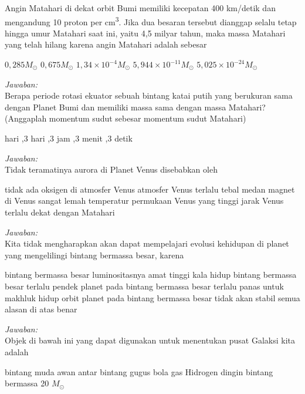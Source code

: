\documentclass[11pt,fleqn]{exam}
\begin{document}
\begin{questions}
\question Angin Matahari di dekat orbit Bumi memiliki kecepatan 400 km/detik dan mengandung 10 proton per cm\textsuperscript{3}. Jika dua besaran tersebut dianggap selalu tetap hingga umur Matahari saat ini,  yaitu 4,5 milyar tahun, maka massa Matahari yang telah hilang karena angin Matahari adalah sebesar
\begin{choices}
\choice $0,285 M_{\odot}$
\choice $0,675 M_{\odot}$
\choice $1,34\times 10^{-4} M_{\odot}$
\choice $5,944\times 10^{-11} M_{\odot}$
\choice $5,025\times 10^{-24} M_{\odot}$
\end{choices}

\textit{Jawaban: }\\


\question Berapa periode rotasi ekuator sebuah bintang katai putih yang berukuran sama dengan Planet Bumi dan memiliki massa sama dengan massa Matahari? (Anggaplah momentum sudut sebesar momentum sudut Matahari)
\begin{choices}
 hari
,3 hari
,3 jam
,3 menit
,3 detik
\end{choices}

\textit{Jawaban: } \\

\question Tidak teramatinya aurora di Planet Venus disebabkan oleh
\begin{choices}
\choice tidak ada oksigen di atmosfer Venus
\choice atmosfer Venus terlalu tebal
\choice medan magnet di Venus sangat lemah
\choice temperatur permukaan Venus yang tinggi
\choice jarak Venus terlalu dekat dengan Matahari
\end{choices}

\textit{Jawaban: } \\

\question Kita tidak mengharapkan akan dapat mempelajari evolusi kehidupan di planet yang mengelilingi bintang bermassa besar, karena
\begin{choices}
\choice bintang bermassa besar luminositasnya amat tinggi
\choice kala hidup bintang bermassa besar terlalu pendek
\choice planet pada bintang bermassa besar terlalu panas untuk makhluk hidup
\choice orbit planet pada bintang bermassa besar tidak akan stabil
\choice semua alasan di atas benar
\end{choices}

\textit{Jawaban: } \\


\question Objek di bawah ini yang dapat digunakan untuk menentukan pusat Galaksi kita adalah
\begin{choices}
\choice bintang muda
\choice awan antar bintang
\choice gugus bola
\choice gas Hidrogen dingin
\choice bintang bermassa 20 $M_{\odot}$
\end{choices}


\end{questions}
\end{document}
